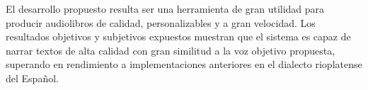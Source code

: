 El desarrollo propuesto resulta ser una herramienta de gran utilidad para producir audiolibros de calidad, personalizables y a gran velocidad. Los resultados objetivos y subjetivos expuestos muestran que el sistema es capaz de narrar textos de alta calidad con gran similitud a la voz objetivo propuesta, superando en rendimiento a implementaciones anteriores en el dialecto rioplatense del Español.